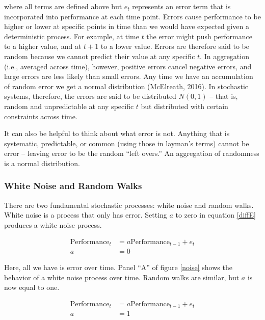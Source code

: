 \documentclass[english,,man]{apa6}
\theoremstyle{definition}
\theoremstyle{definition}
\theoremstyle{definition}
\theoremstyle{remark}
\begin{document}
\noindent where all terms are defined above but \(e_{t}\) represents an
error term that is incorporated into performance at each time point.
Errors cause performance to be higher or lower at specific points in
time than we would have expected given a deterministic process. For
example, at time \(t\) the error might push performance to a higher
value, and at \(t+1\) to a lower value. Errors are therefore said to be
random because we cannot predict their value at any specific \(t\). In
aggregation (i.e., averaged across time), however, positive errors
cancel negative errors, and large errors are less likely than small
errors. Any time we have an accumulation of random error we get a normal
distribution (McElreath, 2016). In stochastic systems, therefore, the
errors are said to be distributed \(N(0, 1)\) -- that is, random and
unpredictable at any specific \(t\) but distributed with certain
constraints across time.

It can also be helpful to think about what error is not. Anything that
is systematic, predictable, or common (using those in layman's terms)
cannot be error -- leaving error to be the random \enquote{left overs.}
An aggregation of randomness is a normal distribution.

\hypertarget{white-noise-and-random-walks}{%
\subsubsection{White Noise and Random
Walks}\label{white-noise-and-random-walks}}

There are two fundamental stochastic processes: white noise and random
walks. White noise is a process that only has error. Setting \(a\) to
zero in equation \ref{diffE} produces a white noise process.

\begin{equation}
\begin{split}
\label{whitenoise}
\textrm{Performance}_{t} &= a \textrm{Performance}_{t-1} + e_{t} \\
a &= 0
\end{split}
\end{equation}

\noindent Here, all we have is error over time. Panel \enquote{A} of
figure \ref{noise} shows the behavior of a white noise process over
time. Random walks are similar, but \(a\) is now equal to one.

\begin{equation}
\begin{split}
\label{rw}
\textrm{Performance}_{t} &= a \textrm{Performance}_{t-1} + e_{t} \\ 
a &= 1 \\ 
\end{split}
\end{equation}
\end{document}
